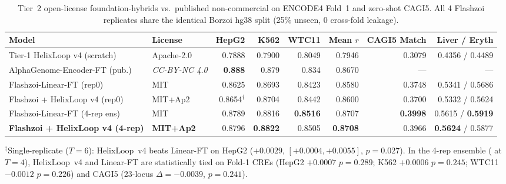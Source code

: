 \documentclass[10.5pt,a4paper]{article}
\begin{document}
\begin{table}[tb]
\scriptsize\setlength{\tabcolsep}{3.5pt}
\caption{Tier~2 open-license foundation-hybrids vs.\ published non-commercial  \citep{avsec2026} on ENCODE4 Fold~1 and zero-shot CAGI5. All 4 Flashzoi replicates share the identical Borzoi hg38 split (25\%  unseen, 0 cross-fold leakage).}\label{tab:tier2}
\begin{tabular}{@{}L{37mm}L{16mm}rrrrrr@{}}
\toprule
Model & License & HepG2 & K562 & WTC11 & Mean $r$ & CAGI5 Match & Liver / Eryth \\
\midrule
Tier-1 HelixLoop v4 (scratch) & Apache-2.0 & 0.7888 & 0.7900 & 0.8049 & 0.7946 & 0.3079 & 0.4356 / 0.4489 \\
AlphaGenome-Encoder-FT (pub.) & \emph{CC-BY-NC 4.0} & \textbf{0.888} & 0.879 & 0.834 & 0.8670 & — & — \\
\midrule
Flashzoi-Linear-FT (rep0) & MIT & 0.8625 & 0.8693 & 0.8423 & 0.8580 & 0.3748 & 0.5341 / 0.5686 \\
Flashzoi + HelixLoop v4 (rep0) & MIT+Ap2 & 0.8654$^\dagger$ & 0.8704 & 0.8442 & 0.8600 & 0.3700 & 0.5332 / 0.5624 \\
Flashzoi-Linear-FT (4-rep ens) & MIT & 0.8789 & 0.8816 & \textbf{0.8516} & 0.8707 & \textbf{0.3998} & 0.5615 / \textbf{0.5919} \\
\textbf{Flashzoi + HelixLoop v4 (4-rep)} & \textbf{MIT+Ap2} & 0.8796 & \textbf{0.8822} & 0.8505 & \textbf{0.8708} & 0.3966 & \textbf{0.5624} / 0.5877 \\
\bottomrule
\end{tabular}
\vspace{2pt}
{\scriptsize $^\dagger$Single-replicate  ($T=6$): HelixLoop~v4 beats Linear-FT on HepG2 ($+0.0029$, $[+0.0004,+0.0055]$, $p=0.027$). In the 4-rep ensemble ( at $T=4$), HelixLoop~v4 and Linear-FT are statistically tied on Fold-1 CREs (HepG2 $+0.0007$ $p=0.289$; K562 $+0.0006$ $p=0.245$; WTC11 $-0.0012$ $p=0.226$) and CAGI5 (23-locus $\Delta=-0.0039$, $p=0.241$).}
\end{table}
\end{document}
